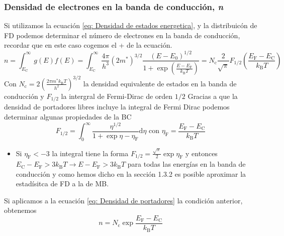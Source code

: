 \subsubsection{Densidad de electrones en la banda de conducción, \textit{n}} \label{sec: Densidad de electrones en la banda de conduccion}
Si utilizamos la ecuación \ref{eq: Densidad de estados energetica}, y la distribuicón de FD podemos determinar el número de electrones en la banda de conducción, recordar que en este caso cogemos el + de la ecuación.
\begin{equation}
    n=\int_{E_\mathrm{C}}^{\infty}g(E)f(E)=\int_{E_\mathrm{C}}^{\infty} \frac{4\pi}
{h^3} (2m^*)^{3/2}\frac{(E- E_0)^{1/2}}{1+\exp\left( \frac{E-E_\mathrm{F}}{k_\mathrm{B}T}\right)}=N_\mathrm{c} \frac{2}{\sqrt{\pi}} F_{1/2} \left(\frac{E_\mathrm{F}-E_\mathrm{C}}{k_\mathrm{B}T}\right)
\label{eq: Densidad de portadores}
\end{equation}
Con $N_\mathrm{c}=2\left(\frac{2\pi m^* k_\mathrm{B} T}{h^2}\right)^{3/2}$ la densidad equivalente de estados en la banda de conducción y $F_{1/2}$ la intergral de Fermi-Dirac de orden $1/2$
Gracias a que la densidad de portadores libres incluye la integral de Fermi Dirac podemos determinar algunas propiedades de la BC
\begin{equation}
    F_{1/2}=\int_0^\infty \frac{\eta ^{1/2}}{1+\exp{\eta-\eta_\mathrm{F}}} \mathrm{d}\eta \text{   con } \eta_\mathrm{F}=\frac{E_\mathrm{F}-E_\mathrm{C}}{k_\mathrm{B}T}
\end{equation}
\begin{itemize}
    \item Si $\eta_\mathrm{F}<-3$ la integral tiene la forma $F_{1/2}=\frac{\sqrt{\pi}}{2} \exp{\eta_\mathrm{F}}$ y entonces $E_\mathrm{C}-E_\mathrm{F}>3k_\mathrm{B}T \rightarrow E-E_\mathrm{F}>3k_\mathrm{B}T$ para todas las energías en la banda de conducción y como hemos dicho en la sección 1.3.2 es posible aproximar la estadísitca de FD a la de MB.
\end{itemize}
Si aplicamos a la ecuación \ref{eq: Densidad de portadores} la condición anterior, obtenemos
\begin{equation}
    n=N_\mathrm{c} \exp{\frac{E_\mathrm{F}-E_\mathrm{C}}{k_\mathrm{B}T}}
    \label{eq: densidad de portadores MB}
\end{equation}
\newpage
